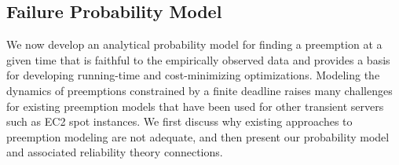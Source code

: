 %
%





\vspace*{\subsecspace}
\subsection{Failure Probability Model}
\label{subsec:analytical-model}

We now develop an analytical probability model for finding a preemption at a given time that is faithful to the empirically observed data and provides a basis for developing running-time and cost-minimizing optimizations. %
%
% 
Modeling the dynamics of preemptions constrained by a finite deadline raises many challenges for existing preemption models that have been used for other transient servers such as EC2 spot instances.
%
We first discuss why existing approaches to preemption modeling are not adequate, and then present our probability model and associated reliability theory connections. 



